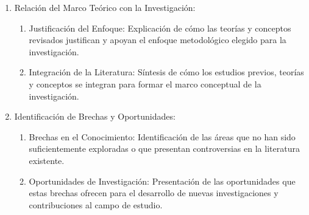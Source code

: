 \begin{enumerate}
\begin{enumerate}
    \end{enumerate}
    \item Relación del Marco Teórico con la Investigación:
    \begin{enumerate}
        \item Justificación del Enfoque: Explicación de cómo las teorías y conceptos revisados justifican y apoyan el enfoque metodológico elegido para la investigación.
        \item Integración de la Literatura: Síntesis de cómo los estudios previos, teorías y conceptos se integran para formar el marco conceptual de la investigación.
    \end{enumerate}
    \item Identificación de Brechas y Oportunidades:
    \begin{enumerate}
        \item Brechas en el Conocimiento: Identificación de las áreas que no han sido suficientemente exploradas o que presentan controversias en la literatura existente.
        \item Oportunidades de Investigación: Presentación de las oportunidades que estas brechas ofrecen para el desarrollo de nuevas investigaciones y contribuciones al campo de estudio.
    \end{enumerate}
\end{enumerate}